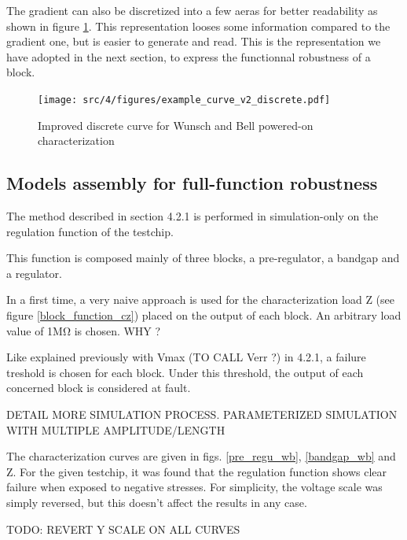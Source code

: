 The gradient can also be discretized into a few aeras for better readability as shown in figure \ref{wb_cz_curve_example_v2_discrete}.
This representation looses some information compared to the gradient one, but is easier to generate and read.
This is the representation we have adopted in the next section, to express the functionnal robustness of a block.

\begin{figure}[!htbp]
  \centering
  \texttt{[image: src/4/figures/example\_curve\_v2\_discrete.pdf]}
  \caption{Improved discrete curve for Wunsch and Bell powered-on characterization}
  \label{wb_cz_curve_example_v2_discrete}
\end{figure}

\subsection{Models assembly for full-function robustness}

The method described in section 4.2.1 is performed in simulation-only on the regulation function of the testchip.

This function is composed mainly of three blocks, a pre-regulator, a bandgap and a regulator.

In a first time, a very naive approach is used for the characterization load Z (see figure \ref{block_function_cz}) placed on the output of each block.
An arbitrary load value of 1MΩ is chosen. WHY ?

Like explained previously with Vmax (TO CALL Verr ?) in 4.2.1, a failure treshold is chosen for each block.
Under this threshold, the output of each concerned block is considered at fault.

DETAIL MORE SIMULATION PROCESS. PARAMETERIZED SIMULATION WITH MULTIPLE AMPLITUDE/LENGTH

The characterization curves are given in figs. \ref{pre_regu_wb}, \ref{bandgap_wb} and Z.
For the given testchip, it was found that the regulation function shows clear failure when exposed to negative stresses.
For simplicity, the voltage scale was simply reversed, but this doesn't affect the results in any case.

TODO: REVERT Y SCALE ON ALL CURVES

